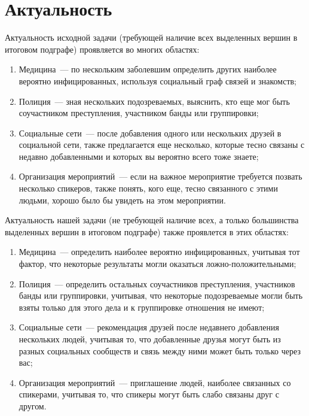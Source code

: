 \section{Актуальность}

Актуальность исходной задачи (требующей наличие всех выделенных вершин в итоговом подграфе) проявляется во многих областях:
\begin{enumerate}
  \item Медицина~--- по нескольким заболевшим определить других наиболее вероятно инфицированных, используя социальный граф связей и знакомств;
  \item Полиция~--- зная нескольких подозреваемых, выяснить, кто еще мог быть соучастником преступления, участником банды или группировки;
  \item Социальные сети~--- после добавления одного или нескольких друзей в социальной сети, также предлагается еще несколько, которые тесно связаны с недавно добавленными и которых вы вероятно всего тоже знаете;
  \item Организация мероприятий~--- если на важное мероприятие требуется позвать несколько спикеров, также понять, кого еще, тесно связанного с этими людьми, хорошо было бы увидеть на этом мероприятии.
\end{enumerate}

Актуальность нашей задачи (не требующей наличие всех, а только большинства выделенных вершин в итоговом подграфе) также проявлется в этих областях:

\begin{enumerate}
  \item Медицина~--- определить наиболее вероятно инфицированных, учитывая тот фактор, что некоторые результаты могли оказаться ложно-положительными;
  \item Полиция~--- определить остальных соучастников преступления, участников банды или группировки, учитывая, что некоторые подозреваемые могли быть взяты только для этого дела и к группировке отношения не имеют;
  \item Социальные сети~--- рекомендация друзей после недавнего добавления нескольких людей, учитывая то, что добавленные друзья могут быть из разных социальных сообществ и связь между ними может быть только через вас;
  \item Организация мероприятий~--- приглашение людей, наиболее связанных со спикерами, учитывая то, что спикеры могут быть слабо связаны друг с другом.
\end{enumerate}

